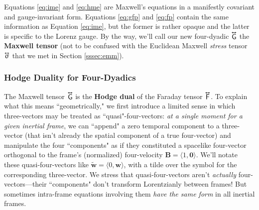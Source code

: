 \documentclass[12pt]{article}
\renewcommand{\vv}[1]{\mathbf{#1}}
\newcommand{\tightoverset}[2]{%
  \mathop{#2}\limits^{\vbox to -.5ex{\kern-0.75ex\hbox{$#1$}\vss}}}
\newcommand{\inlinedy}[1]{\tightoverset{\text{\tiny$\bm\leftrightarrow$}}{#1}}
\begin{document}
Equations \ref{eq:ime} and \ref{eq:hme} are Maxwell's equations in a manifestly covariant and gauge-invariant form. Equations \ref{eq:gfp} and \ref{eq:fp} contain the same information as Equation \ref{eq:ime}, but the former is rather opaque and the latter is specific to the Lorenz gauge. By the way, we'll call our new four-dyadic $\inlinedy{\mathsf{G}}$ the \textbf{Maxwell tensor} (not to be confused with the Euclidean Maxwell \emph{stress} tensor $\inlinedy{\upsigma}$ that we met in Section \ref{sssec:emm}).


\subsubsection{Hodge Duality for Four-Dyadics}\label{sssec:hd}

The Maxwell tensor $\inlinedy{\mathsf{G}}$ is the \textbf{Hodge dual} of the Faraday tensor $\inlinedy{\mathsf{F}}$. To explain what this means ``geometrically," we first introduce a limited sense in which three-vectors may be treated as ``quasi"-four-vectors: \emph{at a single moment for a given inertial frame}, we can ``append" a zero temporal component to a three-vector (that isn't already the spatial component of a true four-vector) and manipulate the four ``components" as if they constituted a spacelike four-vector orthogonal to the frame's (normalized) four-velocity $\vv B = \langle 1, \vv 0 \rangle$. We'll notate these quasi-four-vectors like $\tilde{\vv w} = \langle 0, \vv w \rangle$, with a tilde over the symbol for the corresponding three-vector. We stress that quasi-four-vectors aren't \emph{actually} four-vectors---their ``components" don't transform Lorentzianly between frames! But sometimes intra-frame equations involving them \emph{have the same form} in all inertial frames.
\end{document}
